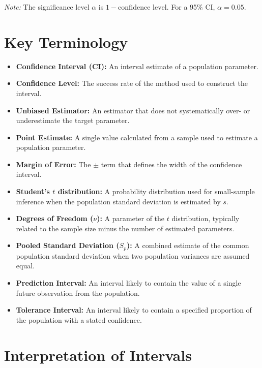 \documentclass[11pt]{article}
\begin{document}
\vspace{0.2in}
\textit{Note:} The significance level $\alpha$ is $1 - \text{confidence level}$. For a 95\% CI, $\alpha = 0.05$.

\section*{Key Terminology}
\begin{itemize}[nosep]
    \item \textbf{Confidence Interval (CI):} An interval estimate of a population parameter.
    \item \textbf{Confidence Level:} The success rate of the method used to construct the interval.
    \item \textbf{Unbiased Estimator:} An estimator that does not systematically over- or underestimate the target parameter.
    \item \textbf{Point Estimate:} A single value calculated from a sample used to estimate a population parameter.
    \item \textbf{Margin of Error:} The $\pm$ term that defines the width of the confidence interval.
    \item \textbf{Student's $t$ distribution:} A probability distribution used for small-sample inference when the population standard deviation is estimated by $s$.
    \item \textbf{Degrees of Freedom ($\nu$):} A parameter of the $t$ distribution, typically related to the sample size minus the number of estimated parameters.
    \item \textbf{Pooled Standard Deviation ($S_p$):} A combined estimate of the common population standard deviation when two population variances are assumed equal.
    \item \textbf{Prediction Interval:} An interval likely to contain the value of a single future observation from the population.
    \item \textbf{Tolerance Interval:} An interval likely to contain a specified proportion of the population with a stated confidence.
\end{itemize}

\section*{Interpretation of Intervals}
\end{document}
